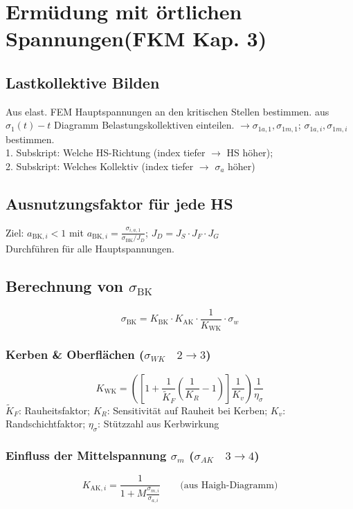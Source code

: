 \section{Ermüdung mit örtlichen Spannungen(FKM Kap. 3)}
    \subsection{Lastkollektive Bilden}
    Aus elast. FEM Hauptspannungen an den kritischen Stellen bestimmen.
    aus $\sigma_1(t)-t$ Diagramm Belastungskollektiven einteilen. $\rightarrow \sigma_{1a,1}, \sigma_{1m,1}$; $\sigma_{1a,i}, \sigma_{1m,i}$ bestimmen.
    \\1. Subskript: Welche HS-Richtung (index tiefer $\rightarrow$ HS höher); 
    \\2. Subskript: Welches Kollektiv (index tiefer $\rightarrow$ $\sigma_a$ höher)
    \subsection{Ausnutzungsfaktor für jede HS}
        Ziel: $a_{\textrm{BK},i} < 1$ mit $\displaystyle a_{\textrm{BK},i} = \frac{\sigma_{i,a,1}}{\sigma_{\textrm{BK}}/J_D}$; \quad $J_D=J_S\cdot J_F \cdot J_G$ 
        \\Durchführen für alle Hauptspannungen.
    \subsection{Berechnung von $\sigma_{\textrm{BK}}$}
        \[\sigma_{\textrm{BK}} = K_{\textrm{BK}} \cdot K_{\textrm{AK}} \cdot \frac{1}{K_{\textrm{WK}}} \cdot \sigma_w \]
        \subsubsection{Kerben \& Oberflächen ($\sigma_{WK}\quad2\rightarrow3$)}
            \[K_{\textrm{WK}}=\left(\left[1+\frac{1}{\widetilde{K}_F}\left(\frac{1}{K_R}-1\right)\right]\frac{1}{K_v}\right)\frac{1}{\eta_{\sigma}}\]
            $\widetilde{K}_F$: Rauheitsfaktor;   $K_R$: Sensitivität auf Rauheit bei Kerben;     $K_v$: Randschichtfaktor;   $\eta_{\sigma}$: Stützzahl aus Kerbwirkung
            \columnbreak
        \subsubsection{Einfluss der Mittelspannung $\sigma_m$ ($\sigma_{AK}\quad3\rightarrow4$)}
            \[K_{\textrm{AK},i}=\frac{1}{1+M\frac{\sigma_{m,i}}{\sigma_{a,i}}} \qquad\textrm{(aus Haigh-Diagramm)}\]
